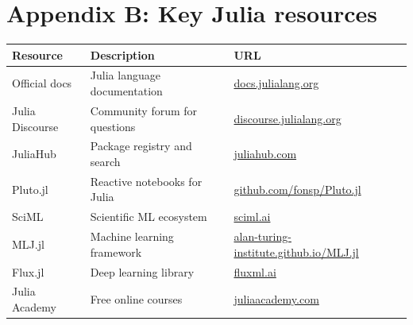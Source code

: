 \documentclass[12pt,a4paper,twoside]{book}
\begin{document}
\chapter*{Appendix B: Key Julia resources}

\begin{longtable}{p{4cm}p{8cm}p{3cm}}
\toprule
\textbf{Resource} & \textbf{Description} & \textbf{URL} \\
\midrule
Official docs & Julia language documentation & \url{docs.julialang.org} \\
Julia Discourse & Community forum for questions & \url{discourse.julialang.org} \\
JuliaHub & Package registry and search & \url{juliahub.com} \\
Pluto.jl & Reactive notebooks for Julia & \url{github.com/fonsp/Pluto.jl} \\
SciML & Scientific ML ecosystem & \url{sciml.ai} \\
MLJ.jl & Machine learning framework & \url{alan-turing-institute.github.io/MLJ.jl} \\
Flux.jl & Deep learning library & \url{fluxml.ai} \\
Julia Academy & Free online courses & \url{juliaacademy.com} \\
\bottomrule
\end{longtable}




\printindex
\end{document}
